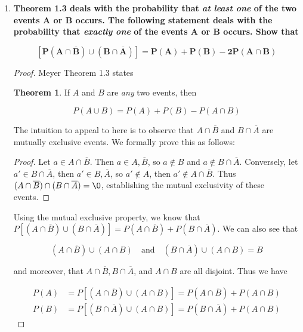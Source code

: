 \documentclass[10pt, oneside]{article}   	%
\theoremstyle{definition}
\newtheorem*{thm}{Theorem}
\begin{document}
\begin{enumerate}[label=1.\arabic*]
\newpage
\item  \begin{tcolorbox}[
  colback=Cerulean!5!white,
  colframe=Cerulean!75!black]
\textbf{Theorem 1.3 deals with the probability that \textit{at least one} of the two events $\bm{A}$ or $\bm{B}$ occurs. The following statement deals with the probability that \textit{exactly one} of the events $\bm{A}$ or $\bm{B}$ occurs. Show that}

\[ \bm{[P(A \cap \overline{B}) \cup (B \cap \overline{A})] = P(A) + P(B) - 2P(A \cap B)} \]
\end{tcolorbox}

\begin{proof}

Meyer Theorem 1.3 states

\begin{thm}
If $A$ and $B$ are \textit{any} two events, then

\[ P(A \cup B) = P(A) + P(B) - P(A \cap B) \]
\end{thm}

The intuition to appeal to here is to observe that $A \cap \overline{B}$ and $B \cap \overline{A}$ are mutually exclusive events. We formally prove this as follows:

\begin{proof}
Let $a \in A \cap \overline{B}$. Then $a \in A, \overline{B}$, so $a \notin B$ and $a \notin B \cap \overline{A}$. Conversely, let $a' \in B \cap \overline{A}$, then $a' \in B, \overline{A}$, so $a' \notin A$, then $a' \notin A \cap \overline{B}$. Thus $(A \cap \overline{B}) \cap (B \cap \overline{A}) = \O$, establishing the mutual exclusivity of these events.
\end{proof}

Using the mutual exclusive property, we know that $P[(A \cap \overline{B}) \cup (B \cap \overline{A})] = P(A \cap \overline{B}) + P(B \cap \overline{A})$. We can also see that

\[ (A \cap \overline{B}) \cup (A \cap B) \quad \text{and} \quad (B \cap \overline{A}) \cup (A \cap B) = B \]

and moreover, that $A \cap \overline{B}, B \cap \overline{A}$, and $A \cap B$ are all disjoint. Thus we have

\begin{align*}
P(A) &= P[(A \cap \overline{B}) \cup (A \cap B)] = P(A \cap \overline{B}) + P(A \cap B) \\
P(B) &= P[(B \cap \overline{A}) \cup (A \cap B)] = P(B \cap \overline{A}) + P(A \cap B)
\end{align*}


\end{proof}
\end{enumerate}
\end{document}
